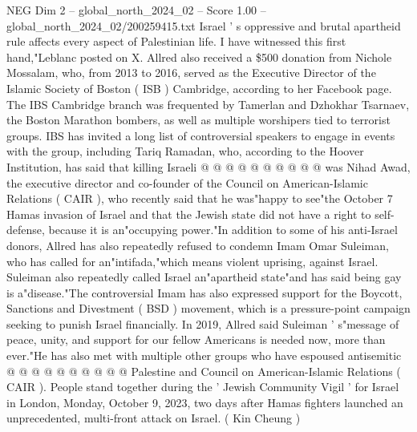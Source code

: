 \begin{textsample}{NEG Dim 2 – global\_north\_2024\_02 – Score 1.00 – global\_north\_2024\_02/200259415.txt}
Israel ' s oppressive and brutal apartheid rule affects every aspect of Palestinian life.
I have witnessed this first hand,"Leblanc posted on X.
Allred also received a \$500 donation from Nichole Mossalam, who, from 2013 to 2016, served as the Executive Director of the Islamic Society of Boston ( ISB ) Cambridge, according to her Facebook page.
The IBS Cambridge branch was frequented by Tamerlan and Dzhokhar Tsarnaev, the Boston Marathon bombers, as well as multiple worshipers tied to terrorist groups.
IBS has invited a long list of controversial speakers to engage in events with the group, including Tariq Ramadan, who, according to the Hoover Institution, has said that killing Israeli @ @ @ @ @ @ @ @ @ @ was Nihad Awad, the executive director and co-founder of the Council on American-Islamic Relations ( CAIR ), who recently said that he was"happy to see"the October 7 Hamas invasion of Israel and that the Jewish state did not have a right to self-defense, because it is an"occupying power."In addition to some of his anti-Israel donors, Allred has also repeatedly refused to condemn Imam Omar Suleiman, who has called for an"intifada,"which means violent uprising, against Israel.
Suleiman also repeatedly called Israel an"apartheid state"and has said being gay is a"disease."The controversial Imam has also expressed support for the Boycott, Sanctions and Divestment ( BSD ) movement, which is a pressure-point campaign seeking to punish Israel financially.
In 2019, Allred said Suleiman ' s"message of peace, unity, and support for our fellow Americans is needed now, more than ever."He has also met with multiple other groups who have espoused antisemitic @ @ @ @ @ @ @ @ @ @ Palestine and Council on American-Islamic Relations ( CAIR ).
People stand together during the ' Jewish Community Vigil ' for Israel in London, Monday, October 9, 2023, two days after Hamas fighters launched an unprecedented, multi-front attack on Israel. ( Kin Cheung )

\end{textsample}
